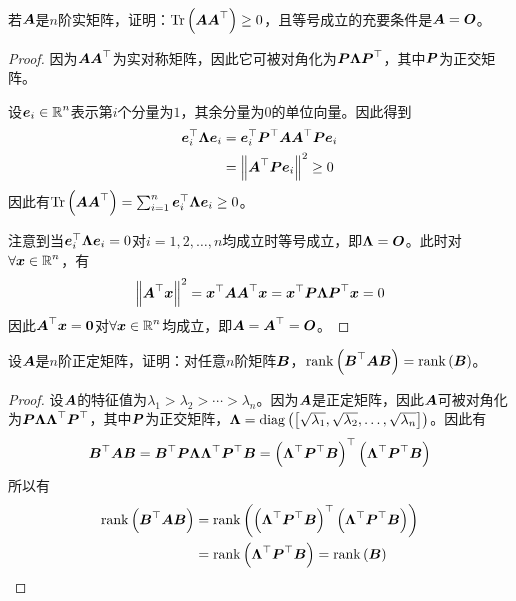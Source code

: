 \begin{problem}
若\(\mata\)是\(n\)阶实矩阵，证明：\(\trace{\mata\mata^\top}\ge0\)，且等号成立的充要条件是\(\mata=\mato\)。
\end{problem}
\begin{proof}
    因为\(\mata\mata^\top\)为实对称矩阵，因此它可被对角化为\(\matp\matlam\matp^\top\)，其中\(\matp\)为正交矩阵。

    设\(\vece_i\in\rea^n\)表示第\(i\)个分量为\(1\)，其余分量为\(0\)的单位向量。因此得到
    \begin{align*}
        \vece_i^\top\matlam\vece_i & =\vece_i^\top\matp^\top\mata\mata^\top\matp\vece_i \\
                                   & =\Abs{\mata^\top\matp\vece_i}^2\ge0
    \end{align*}
    因此有\(\trace{\mata\mata^\top}=\sum_{i=1}^n\vece_i^\top\matlam\vece_i\ge0\)。

    注意到当\(\vece_i^\top\matlam\vece_i=0\)对\(i=1,2,\dots,n\)均成立时等号成立，即\(\matlam=\mato\)。此时对\(\forall\vecx\in\rea^n\)，有
    \begin{equation*}
        \Abs{\mata^\top\vecx}^2=\vecx^\top\mata\mata^\top\vecx=\vecx^\top\matp\matlam\matp^\top\vecx=0
    \end{equation*}
    因此\(\mata^\top\vecx=\veczero\)对\(\forall\vecx\in\rea^n\)均成立，即\(\mata=\mata^\top=\mato\)。
\end{proof}

\begin{problem}
设\(\mata\)是\(n\)阶正定矩阵，证明：对任意\(n\)阶矩阵\(\matb\)，\(\rank{\matb^\top\mata\matb}=\rank{\matb}\)。
\end{problem}
\begin{proof}
    设\(\mata\)的特征值为\(\lambda_1>\lambda_2>\cdots>\lambda_n\)。因为\(\mata\)是正定矩阵，因此\(\mata\)可被对角化为\(\matp\matlam\matlam^\top\matp^\top\)，其中\(\matp\)为正交矩阵，\(\matlam=\diag{\mat{\sqrt{\lambda_1},\sqrt{\lambda_2},\dots,\sqrt{\lambda_n}}}\)。因此有
    \begin{equation*}
        \matb^\top\mata\matb=\matb^\top\matp\matlam\matlam^\top\matp^\top\matb=\mypar{\matlam^\top\matp^\top\matb}^\top\mypar{\matlam^\top\matp^\top\matb}
    \end{equation*}
    所以有
    \begin{align*}
        \rank{\matb^\top\mata\matb} & =\rank{\mypar{\matlam^\top\matp^\top\matb}^\top\mypar{\matlam^\top\matp^\top\matb}} \\
                                    & =\rank{\matlam^\top\matp^\top\matb}=\rank{\matb}
    \end{align*}
\end{proof}